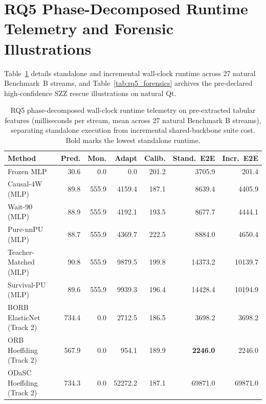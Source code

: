 \documentclass[10pt,a4paper]{article}
\begin{document}
\clearpage
\section{RQ5 Phase-Decomposed Runtime Telemetry and Forensic Illustrations}
\label{sec:or_rq5}

Table~\ref{tab:rq5_runtime} details standalone and incremental wall-clock runtime across 27 natural Benchmark~B streams, and Table~\ref{tab:rq5_forensics} archives the pre-declared high-confidence SZZ rescue illustrations on natural Qt.

\begin{table}[!htbp]
\centering
\caption{RQ5 phase-decomposed wall-clock runtime telemetry on pre-extracted tabular features (milliseconds per stream, mean across 27 natural Benchmark B streams), separating standalone execution from incremental shared-backbone suite cost. Bold marks the lowest standalone runtime.}
\label{tab:rq5_runtime}
\fontsize{7.5}{9.0}\selectfont
\setlength{\tabcolsep}{2.4pt}
\begin{tabular*}{\textwidth}{@{\extracolsep\fill}lrrrrrr@{}}
\toprule
\textbf{Method} & \textbf{Pred.} & \textbf{Mon.} & \textbf{Adapt} & \textbf{Calib.} & \textbf{Stand.\ E2E} & \textbf{Incr.\ E2E} \\
\midrule
Frozen MLP & 30.6 & 0.0 & 0.0 & 201.2 & 3705.9 & 201.4 \\
Causal-4W (MLP) & 89.8 & 555.9 & 4159.4 & 187.1 & 8639.4 & 4405.9 \\
Wait-90 (MLP) & 88.9 & 555.9 & 4192.1 & 193.5 & 8677.7 & 4444.1 \\
Pure-nnPU (MLP) & 88.7 & 555.9 & 4369.7 & 222.5 & 8884.0 & 4650.4 \\
Teacher-Matched (MLP) & 90.8 & 555.9 & 9879.5 & 199.8 & 14373.2 & 10139.7 \\
Survival-PU (MLP) & 89.6 & 555.9 & 9939.3 & 196.4 & 14428.4 & 10194.9 \\
\midrule
BORB ElasticNet (Track 2) & 734.4 & 0.0 & 2712.5 & 186.5 & 3698.2 & 3698.2 \\
ORB Hoeffding (Track 2) & 567.9 & 0.0 & 954.1 & 189.9 & \textbf{2246.0} & 2246.0 \\
ODaSC Hoeffding (Track 2) & 734.3 & 0.0 & 52272.2 & 187.1 & 69871.0 & 69871.0 \\
\bottomrule
\end{tabular*}
\end{table}
\end{document}
